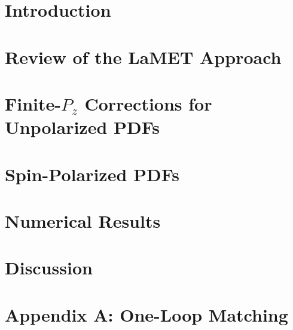 \documentclass[prd,aps,nofootinbib,superscriptaddress,showpacs,floatfix,preprintnumbers]{revtex4}
\begin{document}
\maketitle

\section{Introduction}\label{sec:intro}


\section{Review of the LaMET Approach}\label{sec:LaMET}


\section{Finite-$P_z$ Corrections for Unpolarized PDFs}\label{sec:corrections}


\section{Spin-Polarized PDFs}\label{sec:PolPDFs}


\section{Numerical Results}\label{sec:num}


\section{Discussion}\label{sec:discussion}


\section*{Appendix A: One-Loop Matching}\label{sec:oneloop_appendix}

\end{document}
